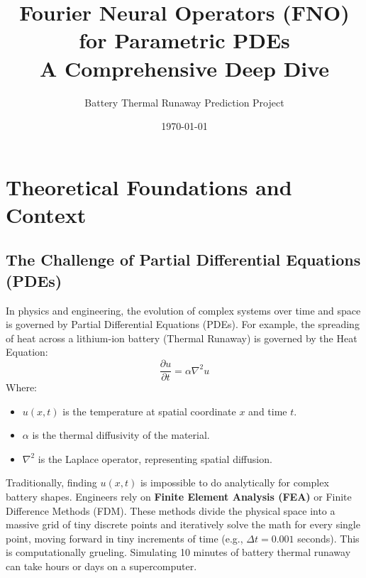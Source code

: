\documentclass[12pt,a4paper]{article}
\title{\textbf{Fourier Neural Operators (FNO) for Parametric PDEs}\\ \Large A Comprehensive Deep Dive}
\author{Battery Thermal Runaway Prediction Project}
\date{\today}
\begin{document}
\maketitle
\tableofcontents
\newpage

\section{Theoretical Foundations and Context}

\subsection{The Challenge of Partial Differential Equations (PDEs)}
In physics and engineering, the evolution of complex systems over time and space is governed by Partial Differential Equations (PDEs). For example, the spreading of heat across a lithium-ion battery (Thermal Runaway) is governed by the Heat Equation:
\begin{equation}
\frac{\partial u}{\partial t} = \alpha \nabla^2 u
\end{equation}
Where:
\begin{itemize}
    \item $u(x, t)$ is the temperature at spatial coordinate $x$ and time $t$.
    \item $\alpha$ is the thermal diffusivity of the material.
    \item $\nabla^2$ is the Laplace operator, representing spatial diffusion.
\end{itemize}

Traditionally, finding $u(x, t)$ is impossible to do analytically for complex battery shapes. Engineers rely on \textbf{Finite Element Analysis (FEA)} or Finite Difference Methods (FDM). These methods divide the physical space into a massive grid of tiny discrete points and iteratively solve the math for every single point, moving forward in tiny increments of time (e.g., $\Delta t = 0.001$ seconds). This is computationally grueling. Simulating 10 minutes of battery thermal runaway can take hours or days on a supercomputer.
\end{document}
